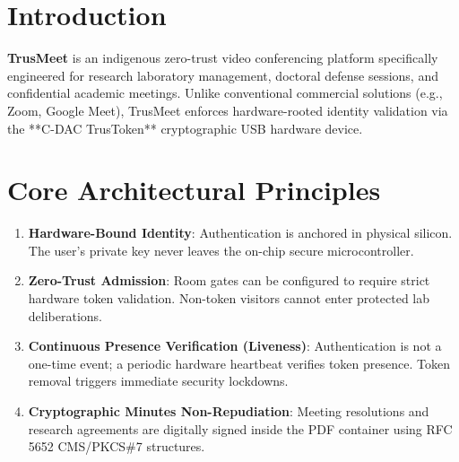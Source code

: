 \documentclass[11pt,a4paper]{report}
\begin{document}
\section{Introduction}
\textbf{TrusMeet} is an indigenous zero-trust video conferencing platform specifically engineered for research laboratory management, doctoral defense sessions, and confidential academic meetings. Unlike conventional commercial solutions (e.g., Zoom, Google Meet), TrusMeet enforces hardware-rooted identity validation via the **C-DAC TrusToken** cryptographic USB hardware device.

\section{Core Architectural Principles}
\begin{enumerate}[label=\textbf{\arabic*.}]
    \item \textbf{Hardware-Bound Identity}: Authentication is anchored in physical silicon. The user's private key never leaves the on-chip secure microcontroller.
    \item \textbf{Zero-Trust Admission}: Room gates can be configured to require strict hardware token validation. Non-token visitors cannot enter protected lab deliberations.
    \item \textbf{Continuous Presence Verification (Liveness)}: Authentication is not a one-time event; a periodic hardware heartbeat verifies token presence. Token removal triggers immediate security lockdowns.
    \item \textbf{Cryptographic Minutes Non-Repudiation}: Meeting resolutions and research agreements are digitally signed inside the PDF container using RFC 5652 CMS/PKCS\#7 structures.
\end{enumerate}
\end{document}
